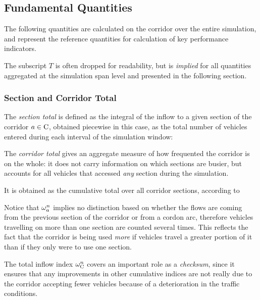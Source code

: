 \subsection{Fundamental Quantities}
The following quantities are calculated on the corridor over the entire simulation, and represent the reference quantities for calculation of key performance indicators.

The subscript $T$ is often dropped for readability, but is \emph{implied} for all quantities aggregated at the simulation span level and presented in the following section. 

\subsubsection{Section and Corridor Total}
The \emph{section total} is defined as the integral of the inflow to a given section of the corridor $a \in \mathrm{C}$, obtained piecewise in this case, as the total number of vehicles entered during each interval of the simulation window:

The \emph{corridor total} gives an aggregate measure of how frequented the corridor is on the whole: it does not carry information on which sections are busier, but accounts for all vehicles that accessed \emph{any} section during the simulation.

It is obtained as the cumulative total over all corridor sections, according to

Notice that $\omega_{a}^{n}$ implies no distinction based on whether the flows are coming from the previous section of the corridor or from a cordon arc, therefore vehicles travelling on more than one section are counted several times. 
This reflects the fact that the corridor is being used \emph{more} if vehicles travel a greater portion of it than if they only were to use one section.

The total inflow index $\omega_{\mathrm{C}}^{n}$ covers an important role as a \emph{checksum}, since it ensures that any improvements in other cumulative indices are not really due to the corridor accepting fewer vehicles because of a deterioration in the traffic conditions.

